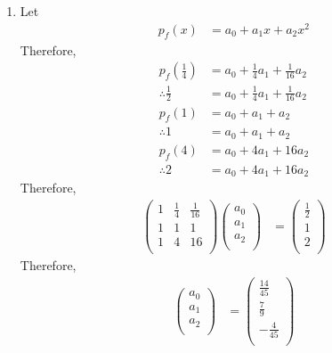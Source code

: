 \documentclass[fleqn, a4paper, 11pt, oneside]{amsart}
\theoremstyle{definition}
\theoremstyle{theorem}
\begin{document}
\begin{solution}
	\begin{enumerate}[leftmargin=*]
		\item
			Let
			\begin{align*}
				p_f(x) &= a_0 + a_1 x + a_2 x^2
			\end{align*}
			Therefore,
			\begin{align*}
				p_f\left( \frac{1}{4} \right) &= a_0 + \frac{1}{4} a_1 + \frac{1}{16} a_2\\
				\therefore \frac{1}{2} &= a_0 + \frac{1}{4} a_1 + \frac{1}{16} a_2\\
				p_f(1) &= a_0 + a_1 + a_2\\
				\therefore 1 &= a_0 + a_1 + a_2\\
				p_f(4) &= a_0 + 4 a_1 + 16 a_2\\
				\therefore 2 &= a_0 + 4 a_1 + 16 a_2
			\end{align*}
			Therefore,
			\begin{align*}
					\begin{pmatrix}
						1 & \frac{1}{4} & \frac{1}{16}\\
						1 & 1 & 1\\
						1 & 4 & 16\\
					\end{pmatrix}
					\begin{pmatrix}
						a_0\\
						a_1\\
						a_2\\
					\end{pmatrix}
				&=
					\begin{pmatrix}
						\frac{1}{2}\\
						1\\
						2\\
					\end{pmatrix}
			\end{align*}
			Therefore,
			\begin{align*}
					\begin{pmatrix}
						a_0\\
						a_1\\
						a_2\\
					\end{pmatrix}
				&=
					\begin{pmatrix}
						\frac{14}{45}\\
						\frac{7}{9}\\
						-\frac{4}{45}\\
					\end{pmatrix}

\end{align*}
\end{enumerate}
\end{solution}
\end{document}
